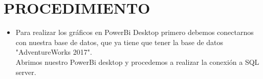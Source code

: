 \section{PROCEDIMIENTO} 

\begin{itemize}
\subsection{Parte 1: Conectar a SQL Server desde Power BI Desktop }
	\item Para realizar los gráficos en PowerBi Desktop primero debemos conectarnos con nuestra base de datos, que ya tiene que tener la base de datos "AdventureWorks 2017".  \\Abrimos nuestro PowerBi desktop y procedemos a realizar la conexión a SQL server.
	\begin{figure}[h]
	\begin{center}
	\end{center}
	\end{figure}


\end{itemize}
